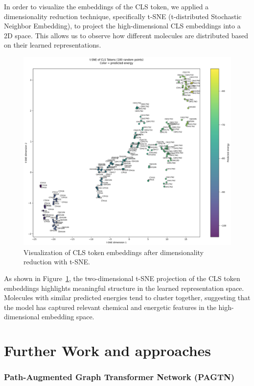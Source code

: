 \documentclass{article}
\begin{document}
In order to visualize the embeddings of the CLS token, we applied a dimensionality reduction technique, specifically t-SNE (t-distributed Stochastic Neighbor Embedding), to project the high-dimensional CLS embeddings into a 2D space. This allows us to observe how different molecules are distributed based on their learned representations.

\begin{figure}[H]
  \centering
  \includegraphics[width=0.9\linewidth]{Images_Ayoub/Training/Transformers/V3/Visualisation_CLS_TOKENS/Image.png}
  \caption{Visualization of CLS token embeddings after dimensionality reduction with t-SNE.}
  \label{fig:cls_embeddings_tsne}
\end{figure}

As shown in Figure~\ref{fig:cls_embeddings_tsne}, the two-dimensional t-SNE projection of the CLS token embeddings highlights meaningful structure in the learned representation space. Molecules with similar predicted energies tend to cluster together, suggesting that the model has captured relevant chemical and energetic features in the high-dimensional embedding space.

\section{Further Work and approaches}

\subsubsection{Path-Augmented Graph Transformer Network (PAGTN)}
\end{document}
